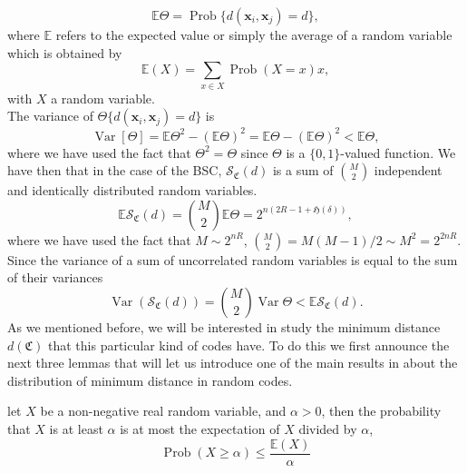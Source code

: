 \begin{equation}
\mathbb{E}\Theta = \operatorname{Prob}\{d(\mathbf{x}_i,\mathbf{x}_j) = d\},
\end{equation}
where $\mathbb{E}$ refers to the expected value or simply the average of a random variable which is obtained by
\begin{equation}
\mathbb{E}(X) = \sum_{x\in X} \operatorname{Prob}(X=x) x,
\end{equation}
with $X$ a random variable.\\
The variance of $\Theta\{d(\mathbf{x}_i,\mathbf{x}_j) = d\}$ is
\begin{equation}
\operatorname{Var}[\Theta] = \mathbb{E}\Theta^2 - (\mathbb{E}\Theta)^2 = \mathbb{E}\Theta - (\mathbb{E}\Theta)^2 <  \mathbb{E}\Theta,
\end{equation}
where we have used the fact that $\Theta^2 = \Theta$ since $\Theta$ is a $\{0,1\}$-valued function. We have then that in the case of the BSC, $\mathcal{S}_{\mathfrak{C}}(d)$ is a sum of ${M \choose 2}$ independent and identically distributed random variables.
\begin{equation}
\mathbb{E}\mathcal{S}_{\mathfrak{C}}(d) = {M\choose 2} \mathbb{E}\Theta = 2^{n(2R-1+\mathfrak{H}(\delta))},
\end{equation}
where we have used the fact that $M \sim 2^{nR}$, ${M \choose 2}=M(M-1)/2\sim M^2=2^{2nR}$. Since the variance of a sum of uncorrelated random variables is equal to the sum of their variances
\begin{equation}
\operatorname{Var}(\mathcal{S}_{\mathfrak{C}}(d)) = {M \choose 2} \operatorname{Var}\Theta < \mathbb{E} \mathcal{S}_{\mathfrak{C}}(d).
\end{equation}
As we mentioned before, we will be interested in study the minimum distance $d(\mathfrak{C})$ that this particular kind of codes have. To do this we first announce the next three lemmas that will let us introduce one of the main results in \cite{barg_random_2002} about the distribution of minimum distance in random codes.


\begin{lemma}
let $X$ be a non-negative real random variable, and $\alpha >0$, then the probability that $X$ is at least $\alpha$ is at most the expectation of $X$ divided by $\alpha$,
\begin{equation}
\operatorname{Prob}(X\geq \alpha)\leq \frac{\mathbb{E}(X)}{\alpha}
\end{equation}
\end{lemma}

